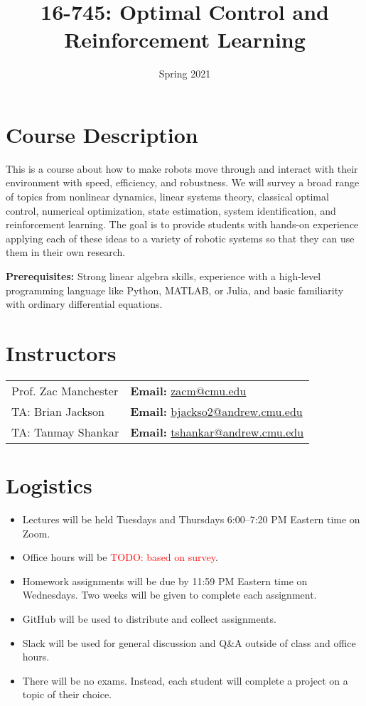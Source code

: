 \documentclass[11pt,letterpaper]{article}
\title{16-745: Optimal Control and Reinforcement Learning}
\author{Spring 2021}
\date{}
\newcommand{\todo}[1]{\textcolor{red}{TODO: #1}}
\begin{document}
\maketitle

\section*{Course Description}

This is a course about how to make robots move through and interact with their environment with speed, efficiency, and robustness. We will survey a broad range of topics from nonlinear dynamics, linear systems theory, classical optimal control, numerical optimization, state estimation, system identification, and reinforcement learning. The goal is to provide students with hands-on experience applying each of these ideas to a variety of robotic systems so that they can use them in their own research.

\medskip
\noindent
\textbf{Prerequisites:} Strong linear algebra skills, experience with a high-level programming language like Python, MATLAB, or Julia, and basic familiarity with ordinary differential equations.

\section*{Instructors}

\begin{center}
\begin{tabular}{l l}
	Prof. Zac Manchester & \textbf{Email:} \href{mailto:zacm@cmu.edu}{zacm@cmu.edu} \\
	TA: Brian Jackson & \textbf{Email:} \href{mailto:bjackso2@andrew.cmu.edu}{bjackso2@andrew.cmu.edu}
	\\
	TA: Tanmay Shankar & \textbf{Email:} \href{mailto:tshankar@andrew.cmu.edu}{tshankar@andrew.cmu.edu}
\end{tabular}
\end{center}

\section*{Logistics}

\begin{itemize}
	\item Lectures will be held Tuesdays and Thursdays 6:00--7:20 PM Eastern time on Zoom.
	\item Office hours will be \todo{based on survey}.
	\item Homework assignments will be due by 11:59 PM Eastern time on Wednesdays. Two weeks will be given to complete each assignment.
	\item GitHub will be used to distribute and collect assignments.
	\item Slack will be used for general discussion and Q\&A outside of class and office hours.
	\item There will be no exams. Instead, each student will complete a project on a topic of their choice.
\end{itemize}
\end{document}
